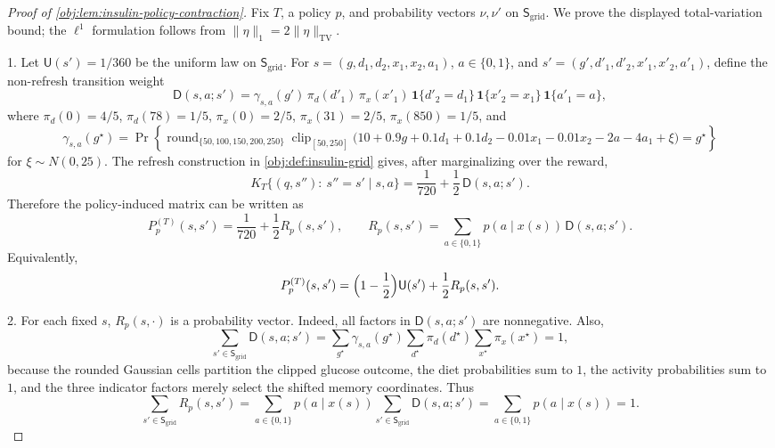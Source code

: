 \begin{proof}[Proof of \cref{obj:lem:insulin-policy-contraction}]
Fix \(T\), a policy \(p\), and probability vectors \(\nu,\nu'\) on
\(\mathsf S_{\mathrm{grid}}\).  We prove the displayed total-variation
bound; the \(\ell^1\) formulation follows from
\(\|\eta\|_1=2\|\eta\|_{\mathrm{TV}}\).

1. Let \(\mathsf U(s')=1/360\) be the uniform law on
\(\mathsf S_{\mathrm{grid}}\).  For
\(s=(g,d_1,d_2,x_1,x_2,a_1)\), \(a\in\{0,1\}\), and
\(s'=(g',d'_1,d'_2,x'_1,x'_2,a'_1)\), define the non-refresh transition
weight
\[
\mathsf D(s,a;s')
=
\gamma_{s,a}(g')\,
\pi_d(d'_1)\,
\pi_x(x'_1)\,
\mathbf 1\{d'_2=d_1\}\,
\mathbf 1\{x'_2=x_1\}\,
\mathbf 1\{a'_1=a\},
\]
where \(\pi_d(0)=4/5\), \(\pi_d(78)=1/5\),
\(\pi_x(0)=2/5\), \(\pi_x(31)=2/5\), \(\pi_x(850)=1/5\), and
\[
\gamma_{s,a}(g^\star)
=
\Pr\!\left\{
\operatorname{round}_{\{50,100,150,200,250\}}
\operatorname{clip}_{[50,250]}
\bigl(
10+0.9g+0.1d_1+0.1d_2-0.01x_1-0.01x_2-2a-4a_1+\xi
\bigr)
=g^\star
\right\}
\]
for \(\xi\sim N(0,25)\).  The refresh construction in
\cref{obj:def:insulin-grid} gives, after marginalizing over the reward,
\[
K_T\{(q,s''):\ s''=s'\mid s,a\}
=
\frac{1}{720}+\frac12\,\mathsf D(s,a;s').
\]
Therefore the policy-induced matrix can be written as
\[
P_p^{(T)}(s,s')
=
\frac{1}{720}
+\frac12 R_p(s,s'),
\qquad
R_p(s,s')
=
\sum_{a\in\{0,1\}}p(a\mid x(s))\,\mathsf D(s,a;s').
\]
Equivalently,
\[
P_p^{(T)}(s,s')
=
\Bigl(1-\frac12\Bigr)\mathsf U(s')
+\frac12 R_p(s,s').
\]

2. For each fixed \(s\), \(R_p(s,\cdot)\) is a probability vector.  Indeed,
all factors in \(\mathsf D(s,a;s')\) are nonnegative.  Also,
\[
\sum_{s'\in\mathsf S_{\mathrm{grid}}}\mathsf D(s,a;s')
=
\sum_{g^\star}\gamma_{s,a}(g^\star)
\sum_{d^\star}\pi_d(d^\star)
\sum_{x^\star}\pi_x(x^\star)
=1,
\]
because the rounded Gaussian cells partition the clipped glucose outcome,
the diet probabilities sum to \(1\), the activity probabilities sum to \(1\),
and the three indicator factors merely select the shifted memory coordinates.
Thus
\[
\sum_{s'\in\mathsf S_{\mathrm{grid}}} R_p(s,s')
=
\sum_{a\in\{0,1\}}p(a\mid x(s))
\sum_{s'\in\mathsf S_{\mathrm{grid}}}\mathsf D(s,a;s')
=
\sum_{a\in\{0,1\}}p(a\mid x(s))
=1.
\]


\end{proof}
